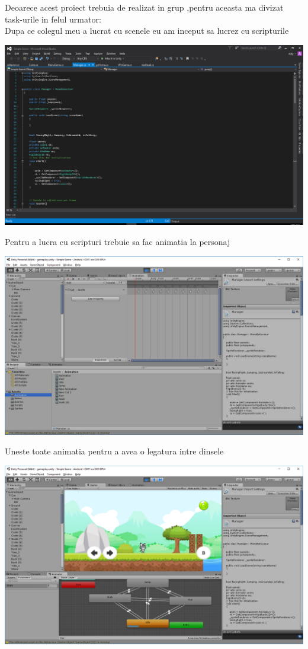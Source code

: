 Deoarece acest proiect trebuia de realizat in grup ,pentru aceasta ma divizat task-urile in felul urmator:\\

Dupa ce colegul meu a lucrat cu scenele eu am inceput sa lucrez cu scripturile
\begin{center}
\includegraphics[scale=0.5]{images/2}
\end{center}

Pentru a lucra cu scripturi trebuie sa fac animatia la personaj
\begin{center}
\includegraphics[scale=0.5]{images/3}
\end{center}

Uneste toate animatia pentru a avea o legatura intre dinsele
\begin{center}
\includegraphics[scale=0.5]{images/4}\\
\end{center}

